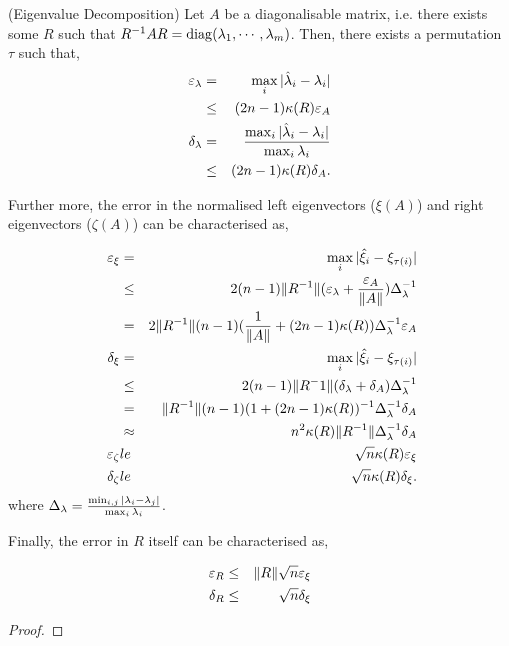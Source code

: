 \begin{proposition}(Eigenvalue Decomposition)
  \label{prop:eigd}
  Let $A$ be a diagonalisable matrix, i.e. there exists some $R$ such that $R^{-1} A R = \operatorname{diag}(\lambda_1, \cdots, \lambda_m)$. Then,
    there exists a permutation $\tau$ such that,
  \begin{eqnarray}
    \varepsilon_{\lambda} &=& \max_i | \hat{\lambda}_i - \lambda_i | \\
      &\le& (2n -1)\kappa(R) \varepsilon_{A} \\
    \delta_{\lambda} &=& \frac{\max_i | \hat{\lambda}_i - \lambda_i |}{\max_i \lambda_i} \\
      &\le& (2n -1)\kappa(R) \delta_{A}.
  \end{eqnarray}

  Further more, the error in the normalised left eigenvectors ($\xi(A)$) and right eigenvectors ($\zeta(A)$) can be characterised as,

  \begin{eqnarray}
    \varepsilon_{\xi} 
      &=& \max_i |\hat{\xi}_i - \xi_{\tau(i)}| \\
      &\le& 2 (n-1) \|R^{-1}\| (\varepsilon_{\lambda} + \frac{\varepsilon_{A}}{\|A\|}) \Delta_{\lambda}^{-1} \\
      &=& 2 \|R^{-1}\| (n-1)(\frac{1}{\|A\|} + (2n-1)\kappa(R)) \Delta_{\lambda}^{-1} \varepsilon_{A} \\\
    \delta_{\xi} 
      &=& \max_i |\hat{\xi}_i - \xi_{\tau(i)}| \\
      &\le& 2 (n-1) \|R^-1\| (\delta_{\lambda} + \delta_{A}) \Delta_{\lambda}^{-1} \\
      &=& \|R^{-1}\| (n-1)(1 + (2n-1)\kappa(R)) ^{-1} \Delta_{\lambda}^{-1} \delta_{A} \\\
      &\approx& n^2 \kappa(R) \|R^{-1}\| \Delta_{\lambda}^{-1} \delta_{A} \\
    \varepsilon_{\zeta} 
      &le& \sqrt{n} \kappa(R) \varepsilon_{\xi} \\
    \delta_{\zeta} 
      &le& \sqrt{n} \kappa(R) \delta_{\xi}.
  \end{eqnarray}
  where $\Delta_{\lambda} = \frac{\min_{i,j} |\lambda_i - \lambda_j|}{\max_i \lambda_i}$.

  Finally, the error in $R$ itself can be characterised as,

  \begin{eqnarray}
    \varepsilon_{R} &\le&  \|R\| \sqrt{n} \varepsilon_{\xi} \\
    \delta_{R} &\le&  \sqrt{n} \delta_{\xi} 
  \end{eqnarray}

\end{proposition}
\begin{proof}
\end{proof}

